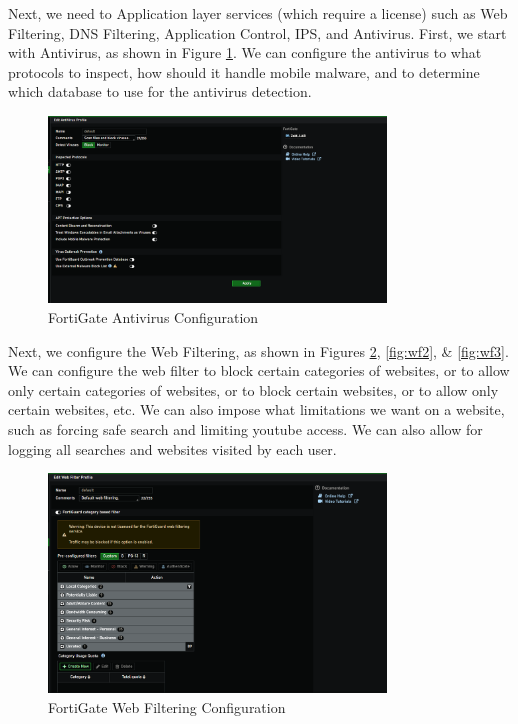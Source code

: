 \documentclass[12pt]{report}
\begin{document}
Next, we need to Application layer services (which require a license) such as Web Filtering, DNS Filtering, Application Control, IPS, and Antivirus. 
First, we start with Antivirus, as shown in Figure \ref{fig:antivirus}. We can configure the antivirus to what protocols to inspect, how should it handle mobile malware, and to determine which database to use for the antivirus detection.
\begin{figure}
    \centering
    \includegraphics[width=0.8\textwidth]{images/Implementation/av.png}
    \caption{FortiGate Antivirus Configuration}
    \label{fig:antivirus}
\end{figure}
Next, we configure the Web Filtering, as shown in Figures \ref{fig:wf1}, \ref{fig:wf2}, \& \ref{fig:wf3}. We can configure the web filter to block certain categories of websites, or to allow only certain categories of websites, or to block certain websites, or to allow only certain websites, etc. We can also impose what limitations we want on a website, such as forcing safe search and limiting youtube access. We can also allow for logging all searches and websites visited by each user.
\begin{figure}
    \centering
    \includegraphics[width=0.8\textwidth]{images/Implementation/wf1.png}
    \caption{FortiGate Web Filtering Configuration}
    \label{fig:wf1}
\end{figure}
\end{document}

